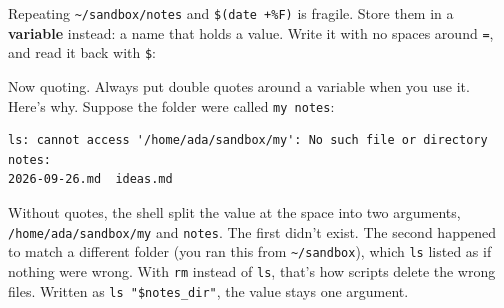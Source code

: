 Repeating \texttt{\textasciitilde{}/sandbox/notes} and \texttt{\$(date\ +\%F)} is fragile. Store them in a \textbf{variable} instead: a name that holds a value. Write it with no spaces around \texttt{=}, and read it back with \texttt{\$}:

\begin{codeblock}

\begin{Shaded}
\begin{Highlighting}[]
\OperatorTok{=}
\OperatorTok{=}\VariableTok{$(}\VariableTok{)}
\OperatorTok{=}\StringTok{/}
\end{Highlighting}
\end{Shaded}

\end{codeblock}


Now quoting. Always put double quotes around a variable when you use it. Here's why. Suppose the folder were called \texttt{my\ notes}:

\begin{codeblock}

\begin{Shaded}
\begin{Highlighting}[]
\OperatorTok{=}
 
\end{Highlighting}
\end{Shaded}

\end{codeblock}

\begin{codeblock}
\begin{Verbatim}[formatcom=\outputstyle]
ls: cannot access '/home/ada/sandbox/my': No such file or directory
notes:
2026-09-26.md  ideas.md
\end{Verbatim}
\end{codeblock}

Without quotes, the shell split the value at the space into two arguments, \texttt{/}\allowbreak{}\texttt{home/}\allowbreak{}\texttt{ada/}\allowbreak{}\texttt{sandbox/}\allowbreak{}\texttt{my} and \texttt{notes}. The first didn't exist. The second happened to match a different folder (you ran this from \texttt{\textasciitilde{}/sandbox}), which \texttt{ls} listed as if nothing were wrong. With \texttt{rm} instead of \texttt{ls}, that's how scripts delete the wrong files. Written as \texttt{ls\ "\$notes\_dir"}, the value stays one argument.

